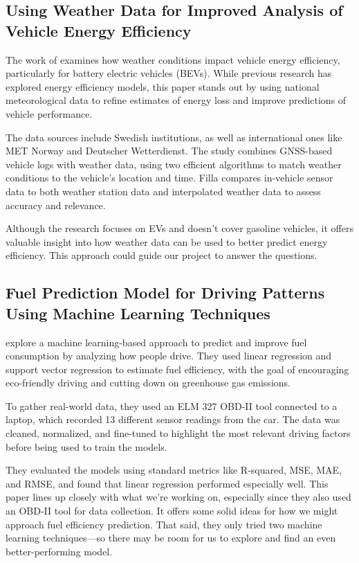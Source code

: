 \documentclass[letterpaper]{article}
\begin{document}
\subsection*{Using Weather Data for Improved Analysis of Vehicle Energy
Efficiency}

The work of \cite{filla2025using} examines how weather conditions impact vehicle energy
efficiency, particularly for battery electric vehicles (BEVs). While previous
research has explored energy efficiency models, this paper stands out by using
national meteorological data to refine estimates of energy loss and improve
predictions of vehicle performance. 

The data sources include Swedish
institutions, as well as international ones like MET Norway and Deutscher
Wetterdienst. The study combines GNSS-based vehicle logs with weather data,
using two efficient algorithms to match weather conditions to the vehicle's
location and time. Filla compares in-vehicle sensor data to both weather station
data and interpolated weather data to assess accuracy and relevance. 

Although the research focuses on EVs and doesn't cover gasoline vehicles, it offers
valuable insight into how weather data can be used to better predict energy
efficiency. This approach could guide our project to answer the questions.

\subsection*{Fuel Prediction Model for Driving Patterns Using Machine Learning
Techniques}

\cite{Manjunath2024} explore a machine learning-based approach to predict and improve
fuel consumption by analyzing how people drive. They used linear regression and
support vector regression to estimate fuel efficiency, with the goal of
encouraging eco-friendly driving and cutting down on greenhouse gas emissions.

To gather real-world data, they used an ELM 327 OBD-II tool connected to a
laptop, which recorded 13 different sensor readings from the car. The data was
cleaned, normalized, and fine-tuned to highlight the most relevant driving
factors before being used to train the models. 

They evaluated the models using
standard metrics like R-squared, MSE, MAE, and RMSE, and found that linear
regression performed especially well. This paper lines up closely with what
we're working on, especially since they also used an OBD-II tool for data
collection. It offers some solid ideas for how we might approach fuel efficiency
prediction. That said, they only tried two machine learning techniques---so
there may be room for us to explore and find an even better-performing model.
\end{document}

